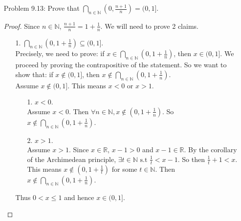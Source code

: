 \documentclass{article}
\theoremstyle{claim}
\theoremstyle{definition}
\begin{document}
\begin{enumerate}
\begin{proof}
\begin{enumerate}
\begin{enumerate}
                            Assume $a \in A$. Then $a \in A \cup \left \lgroup \bigcup\limits_{i \in \mathcal{I}} B_i \right \rgroup$.
                        \item $a \notin A$.\\
                            Assume $a \notin A$. Then $\exists k \in \mathcal{I} \text{ s.t } a \in B_k$. Then $a \in \bigcup\limits_{k \in \mathcal{I}} B_i$. Thus $a \in \left \lgroup \bigcup\limits_{k \in \mathcal{I}} B_i \right \rgroup \cup A$.
                    \end{enumerate}
                Proving 2 above claims entails: $A \cup \left \lgroup \bigcup\limits_{i \in \mathcal{I}} B_i \right \rgroup = \bigcup\limits_{i \in \mathcal{I}} (A \cup B_i)$.
            \end{enumerate}
        \end{proof}
    \item[Problem 9.13:] Prove that $\bigcap\limits_{n \in \mathbb{N}} (0, \frac{n+1}{n}) = (0, 1]$.
        \begin{proof}
            Since $n \in \mathbb{N}$, $\frac{n+1}{n} = 1 + \frac{1}{n}$.
            We will need to prove 2 claims.
            \begin{enumerate}
                \item[1.] $\bigcap\limits_{n \in \mathbb{N}} (0, 1 + \frac{1}{n}) \subseteq (0, 1]$.\\
                    Precisely, we need to prove: if $x \in \bigcap\limits_{n \in \mathbb{N}} (0, 1 + \frac{1}{n})$, then $x \in (0, 1]$. We proceed by proving the contrapositive of the statement. So we want to show that: if $x \notin (0, 1]$, then $x \notin \bigcap\limits_{n \in \mathbb{N}} (0, 1 + \frac{1}{n})$.\\
                    Assume $x \notin (0, 1]$. This means $x < 0$ or $x > 1$.
                    \begin{enumerate}
                        \item[1.] $x < 0$.\\
                            Assume $x < 0$. Then $\forall n \in \mathbb{N},x \notin (0, 1 + \frac{1}{n})$. So $x \notin \bigcap\limits_{n \in \mathbb{N}} (0, 1 + \frac{1}{n})$.
                        \item[2.] $x > 1$.\\
                            Assume $x > 1$. Since $x \in \mathbb{R}$, $x - 1 > 0$ and $x - 1 \in \mathbb{R}$. By the corollary of the Archimedean principle, $\exists t \in \mathbb{N} \text{ s.t } \frac{1}{t} < x - 1$. So then $\frac{1}{t} + 1 < x$. This means $x \notin (0, 1 + \frac{1}{t})$ for some $t \in \mathbb{N}$. Then $x \notin \bigcap\limits_{n \in \mathbb{N}} (0, 1 + \frac{1}{n})$.
                    \end{enumerate}
                    Thus $0 < x \le 1$ and hence $x \in (0, 1]$.


\end{enumerate}
\end{proof}
\end{enumerate}
\end{document}
